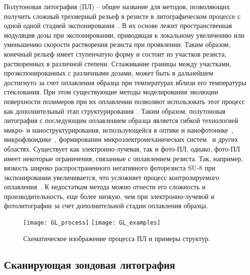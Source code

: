Полутоновая литография (ПЛ) -- общее название для методов, позволяющих получить сложный трехмерный рельеф в резисте в литографическом процессе с одной одной стадией экспонирования~\cite{GL_general}. В их основе лежит пространственная модуляция дозы при экспонировании, приводящая к локальному увеличению или уменьшению скорости растворения резиста при проявлении. Таким образом, конечный рельеф имеет ступенчатую форму и состоит из участков резиста, растворенных в различной степени. Сглаживание границы между участками, проэкспонированных с различными дозами, может быть в дальнейшем достигнуто за счет оплавления образца при температурах вблизи его температуры стеклования. При этом существующие методы моделирования эволюции поверхности полимеров при их оплавлении позволяют использовать этот процесс как дополнительный этап структурирования~\cite{Kirchner_reflow}. Таким образом, полутоновая литография с последующим оплавлением образца является гибкой технологией микро- и наноструктурирования, использующейся в оптике и нанофотонике~\cite{GL_optics}, микрофлюидике~\cite{GL_microfluidics}, формировании микроэлектромеханических систем~\cite{GL_MEMS} и других областях. Существует как электронно-лучевая, так и фото-ПЛ, однако, фото-ПЛ имеет некоторые ограничения, связанные с оплавлением резиста. Так, например, вязкость широко распространенного негативного фоторезиста SU-8 при экспонировании увеличивается, что усложняет процесс контролируемого оплавления~\cite{Kirchner_GL_review}. К недостаткам метода можно отнести его сложность и производительность, еще более низкую, чем при электронно-лучевой и фотолитографии за счет дополнительной стадии оплавления образца.

\begin{figure}
	\centering
	\texttt{[image: GL\_process]}
	\texttt{[image: GL\_examples]}
	\caption{Схематическое изображение процесса ПЛ и примеры структур.}
\end{figure}


\subsection{Сканирующая зондовая литография}

